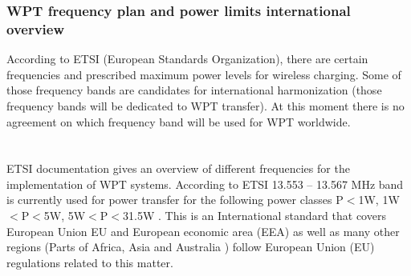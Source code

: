 \documentclass[12pt]{article}
\begin{document}
\subsubsection{WPT frequency plan and power limits international overview}
According to ETSI (European Standards Organization), there are certain frequencies and prescribed maximum power levels for wireless charging. Some of those frequency bands are candidates for international harmonization (those frequency bands will be dedicated to WPT transfer). At this moment there is no agreement on which frequency band will be used for WPT worldwide.\\
\hfill \\
\pagebreak
\hfill \\
\indent
ETSI documentation  gives an overview of different frequencies for the implementation of WPT systems. According to ETSI 13.553 – 13.567 MHz band is currently used for power transfer for the following power classes P$<$1W, 1W$<$P$<$5W, 5W$<$P$<$31.5W \cite{en55011}. This is an International standard that covers European Union EU and European economic area (EEA) as well as many other regions (Parts of Africa, Asia and  Australia )  follow European Union (EU) regulations related to this matter.\\
\end{document}

